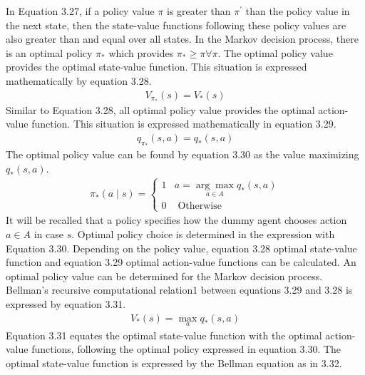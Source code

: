\documentclass[12pt,twoside,a4]{mwbk}
\begin{document}
In Equation 3.27, if a policy value $\pi$ is greater than $\pi^{\prime}$ than the policy value in the next state, then the state-value functions following these policy values are also greater than and equal over all states. In the Markov decision process, there is an optimal policy $\pi_{*}$ which provides $\pi_{*} \geq \pi \forall \pi$. The optimal policy value provides the optimal state-value function. This situation is expressed mathematically by equation 3.28.
\begin{subequations}
\begin{align}
   V_{\pi_{*}}(s)=V_{*}(s)
\end{align}
\end{subequations}
Similar to Equation 3.28, all optimal policy value provides the optimal action-value function. This situation is expressed mathematically in equation 3.29.
\begin{subequations}
\begin{align}
   q_{\pi_{*}}(s, a)=q_{*}(s, a)
\end{align}
\end{subequations}
The optimal policy value can be found by equation 3.30 as the value maximizing $q_{*}(s, a)$.
\begin{subequations}
\begin{align}
   \pi_{*}(a \mid s)=\left\{\begin{array}{lc}
1 & a=\underset{a \in A}{\arg \max } q_{*}(s, a) \\
0 & \text { Otherwise }
\end{array}\right.
\end{align}
\end{subequations}
It will be recalled that a policy specifies how the dummy agent chooses action $a \in A$ in case $s$. Optimal policy choice is determined in the expression with Equation 3.30. Depending on the policy value, equation 3.28 optimal state-value function and equation 3.29 optimal action-value functions can be calculated. An optimal policy value can be determined for the Markov decision process. Bellman's recursive computational relation1 between equations 3.29 and 3.28 is expressed by equation 3.31.
\begin{subequations}
\begin{align}
   V_{*}(s)=\max _{a} q_{*}(s, a)
\end{align}
\end{subequations}
Equation 3.31 equates the optimal state-value function with the optimal action-value functions, following the optimal policy expressed in equation 3.30. The optimal state-value function is expressed by the Bellman equation as in 3.32.
\end{document}

